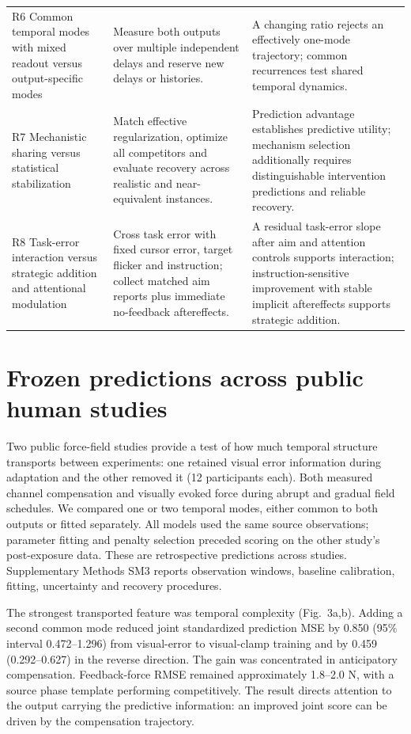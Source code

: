 \documentclass[11pt,a4paper]{article}
\begin{document}
\begin{longtable}{p{}p{}p{}}
R6 Common temporal modes with mixed readout versus output-specific modes & Measure both outputs over multiple independent delays and reserve new delays or histories. & A changing ratio rejects an effectively one-mode trajectory; common recurrences test shared temporal dynamics.\\[9pt]
R7 Mechanistic sharing versus statistical stabilization & Match effective regularization, optimize all competitors and evaluate recovery across realistic and near-equivalent instances. & Prediction advantage establishes predictive utility; mechanism selection additionally requires distinguishable intervention predictions and reliable recovery.\\[9pt]
R8 Task-error interaction versus strategic addition and attentional modulation & Cross task error with fixed cursor error, target flicker and instruction; collect matched aim reports plus immediate no-feedback aftereffects. & A residual task-error slope after aim and attention controls supports interaction; instruction-sensitive improvement with stable implicit aftereffects supports strategic addition.\\[9pt]
\end{longtable}\normalsize
\section{Frozen predictions across public human studies}
Two public force-field studies provide a test of how much temporal structure transports between experiments: one retained visual error information during adaptation and the other removed it (12 participants each). Both measured channel compensation and visually evoked force during abrupt and gradual field schedules. We compared one or two temporal modes, either common to both outputs or fitted separately. All models used the same source observations; parameter fitting and penalty selection preceded scoring on the other study's post-exposure data. These are retrospective predictions across studies. Supplementary Methods SM3 reports observation windows, baseline calibration, fitting, uncertainty and recovery procedures. \cite{franklin2021,franklin2023}

The strongest transported feature was temporal complexity (Fig.~3a,b). Adding a second common mode reduced joint standardized prediction MSE by 0.850 (95\% interval 0.472--1.296) from visual-error to visual-clamp training and by 0.459 (0.292--0.627) in the reverse direction. The gain was concentrated in anticipatory compensation. Feedback-force RMSE remained approximately 1.8--2.0 N, with a source phase template performing competitively. The result directs attention to the output carrying the predictive information: an improved joint score can be driven by the compensation trajectory.
\end{document}
